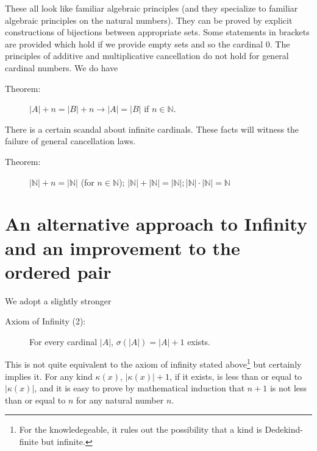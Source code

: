 \documentclass[12pt]{article}
\begin{document}
\begin{description}
\begin{enumerate}
\end{enumerate}

These all look like familiar algebraic principles (and they specialize to familiar algebraic principles on the natural numbers).  They can be proved by explicit constructions of bijections between appropriate sets.  Some statements in brackets are provided which hold if we provide empty sets and so the cardinal 0.  The principles of additive and multiplicative cancellation do not hold for general cardinal numbers.
We do have 

\begin{description}

\item[Theorem:]  $|A|+n = |B|+n \rightarrow |A|=|B|$ if $n \in {\mathbb N}$.

\end{description}

There is a certain scandal about infinite cardinals.  These facts will witness the failure of general cancellation laws.

\begin{description}

\item[Theorem:]  $|\mathbb N|+n = |\mathbb N|$  (for $n \in \mathbb N$); $|\mathbb N|+|\mathbb N|=|\mathbb N|;  |\mathbb N|\cdot|\mathbb N|= \mathbb N$

\end{description}

\end{description}


\section{An alternative approach to Infinity and an improvement to the ordered pair}

We adopt a slightly stronger

\begin{description}

\item[Axiom of Infinity (2):]  For every cardinal $|A|$, $\sigma(|A|) = |A|+1$ exists.

\end{description}

This is not quite equivalent to the axiom of infinity stated above\footnote{For the knowledegeable, it rules out the possibility that a kind is Dedekind-finite but infinite.} but certainly implies it.  For any kind $\kappa(x)$, $|\kappa(x)|+1$, if it exists, is less than or equal to $|\kappa(x)|$, and it is easy to prove by mathematical induction that $n+1$ is not less than or equal to $n$ for any natural number $n$.
\end{document}
